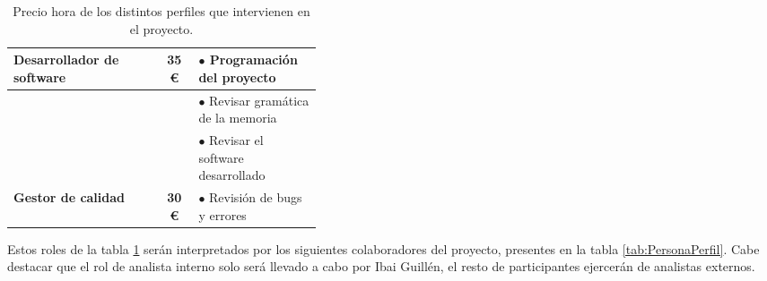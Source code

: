 \begin{table}[H]
\begin{center}
\begin{tabular}{|l|c|p{0.4\linewidth}|}
                
            \rowcolor{GrisTabla}
            \textbf{Desarrollador de software} & \textbf{35 \euro} & $\bullet$  Programación del proyecto\\
            \hline

            & & $\bullet$ Revisar gramática de la memoria\\
            & & $\bullet$ Revisar el software desarrollado\\
            \multirow{-3}{*}{\textbf{Gestor de calidad}} & \multirow{-3}{*}{\textbf{30 \euro}} & $\bullet$ Revisión de bugs y errores\\
            \hline

        \end{tabular}
        \caption{\centering Precio hora de los distintos perfiles que intervienen en el proyecto.}
        \label{tab:PrecioPerfil}
    \end{center}    
\end{table}
\pagebreak
Estos roles de la tabla \ref{tab:PrecioPerfil} serán interpretados por los siguientes colaboradores del proyecto, presentes en la tabla \ref{tab:PersonaPerfil}. Cabe destacar que el rol de analista interno solo será llevado a cabo por Ibai Guillén, el resto de participantes ejercerán de analistas externos.
